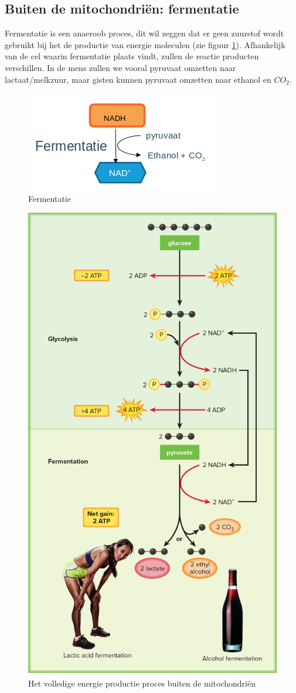 \documentclass[a4paper,kul]{kulakarticle} %
\begin{document}
\subsection{Buiten de mitochondriën: fermentatie}
Fermentatie is een anaeroob proces, dit wil zeggen dat er geen zuurstof wordt gebruikt bij het de productie van energie moleculen (zie figuur \ref{fig:fermentatie}). Afhankelijk van de cel waarin fermentatie plaats vindt, zullen de reactie producten verschillen. In de mens zullen we vooral pyruvaat omzetten naar lactaat/melkzuur, maar gisten kunnen pyruvaat omzetten naar ethanol en $CO_2$. 
\begin{figure}[h]
	\centering
	\includegraphics[width=0.7\linewidth]{Fermentatie}
	\caption[Fermentatie]{Fermentatie}
	\label{fig:fermentatie}
\end{figure}
\begin{figure}[!h]
	\centering
	\includegraphics[width=0.7\linewidth]{BuitenEnergieProces}
	\caption[Buiten mitochondria]{Het volledige energie productie proces buiten de mitochondriën}
	\label{fig:buitenenergieproces}
\end{figure}
\newpage
\end{document}
